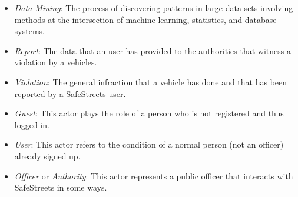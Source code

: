 \begin{itemize}
	\item \textit{Data Mining}: The process of discovering patterns in large data sets involving methods at the intersection of machine learning, statistics, and database systems.
	\item \textit{Report}: The data that an user has provided to the authorities that witness a violation by a vehicles.
	\item \textit{Violation}: The general infraction that a vehicle has done and that has been reported by a SafeStreets user.\\
	\item \textit{Guest}: This actor plays the role of a person who is not registered and thus logged in.
	\item \textit{User}: This actor refers to the condition of a normal person (not an officer) already signed up.
	\item \textit{Officer} or \textit{Authority}: This actor represents a public officer that interacts with SafeStreets in some ways.
\end{itemize}